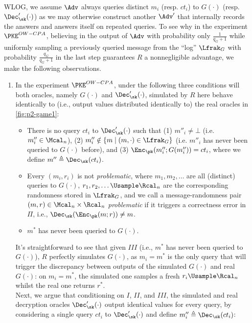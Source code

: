 \begin{answer}[i]
    WLOG, we assume $\Adv$ always queries distinct $m_i$ (resp. $ct_i$) to $G(\cdot)$ (resp. $\Dec'_\sk(\cdot)$) as we may otherwise construct another $\Adv'$ that internally records the answers and answers itself on repeated queries.
    To see why in the experiment $\PKE^{OW-CPA}$, believing in the output of $\Adv$ with probability only $\frac{1}{q_G+1}$ while uniformly sampling a previously queried message from the ``log'' $\Lfrak_G$ with probability $\frac{q_G}{q_G+1}$ in the last step guarantees $R$ a nonnegligible advantage, we make the following observations.
    \begin{enumerate}
        \item In the experiment $\PKE^{OW-CPA}$, under the following three conditions will both oracles, namely $G(\cdot)$ and $\Dec'_\sk(\cdot)$, simulated by $R$ here behave identically to (i.e., output values distributed identically to) the real oracles in \autoref{fig:p2-game1}:
        \begin{itemize}
            \item[Event $I$] There is no query $ct_i$ to $\Dec'_\sk(\cdot)$ such that (1) $m''_i\neq \bot$ (i.e. $m''_i\in \Mcal_n$), (2) $m''_i\notin \{m\mid (m,\cdot)\in \Lfrak_G\}$ (i.e. $m''_i$ has never been queried to $G(\cdot)$ before), and (3) $\Enc_\pk(m''_i; G(m''_i))=ct_i$, where we define $m''\triangleq \Dec_\sk(ct_i)$.  
            \item[Event $II$] Every $(m_i, r_i)$ is not \textit{problematic}, where $m_1, m_2,\ldots$ are all (distinct) queries to $G(\cdot)$, $r_1, r_2,\ldots \Usample \Rcal_n$ are the corresponding randomness stored in $\Lfrak_G$,  and  we call a message-randomness pair $(m,r)\in\Mcal_n\times \Rcal_n$ \textit{problematic} if it triggers a correctness error in $\Pi$, i.e., $\Dec_\sk(\Enc_\pk(m; r))\neq m$.
            \item[Event $III$] $m^\ast$ has never been queried to $G(\cdot)$. 
        \end{itemize}
        It's straightforward to see that given $III$ (i.e., $m^\ast$ has never been queried to $G(\cdot)$), $R$ perfectly simulates $G(\cdot)$, as  $m_i=m^\ast$ is the only query that will trigger the discrepancy between outputs of the simulated $G(\cdot)$ and real $G(\cdot)$: on $m_i=m^\ast$, the simulated one samples a fresh $r_i\Usample\Rcal_n$ whilst the real one returns $r^\ast$.\\
        Next, we argue that conditioning on $I$, $II$, and $III$,  the simulated and real decryption oracles $\Dec'_\sk(\cdot)$ output identical values for every query, by considering a single query $ct_i$ to $\Dec'_\sk(\cdot)$ and define $m''_i\triangleq \Dec_\sk(ct_i)$:

\end{enumerate}
\end{answer}
